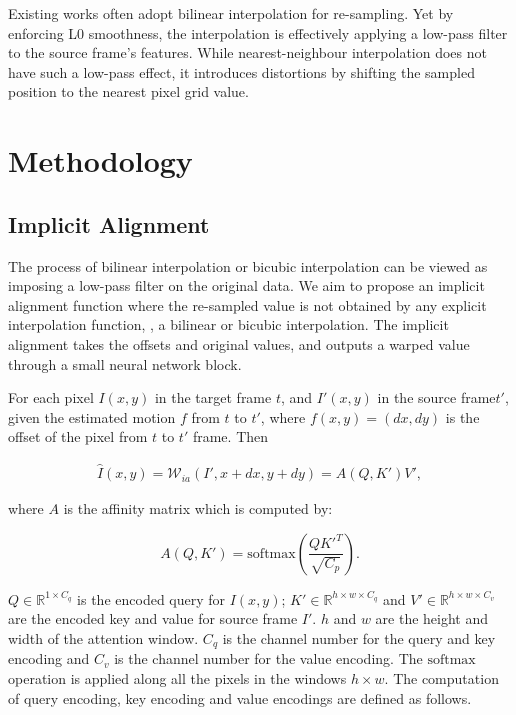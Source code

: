\documentclass[10pt,twocolumn,letterpaper]{article}
\begin{document}
Existing works often adopt bilinear interpolation for re-sampling.  Yet by enforcing L0 smoothness, the interpolation is effectively applying a low-pass filter to the source frame's features. While nearest-neighbour interpolation does not have such a low-pass effect, 
it introduces distortions by shifting the sampled position to the nearest pixel grid value.














\section{Methodology}

\subsection{Implicit Alignment}

The process of bilinear interpolation or bicubic interpolation can be viewed as imposing a low-pass filter on the original data\cite{youssef1998analysis}. We aim to propose an implicit alignment function where the re-sampled value is not obtained by 
any explicit interpolation function, \eg, a bilinear or bicubic interpolation. The implicit alignment takes the offsets and original values, and outputs a warped value through a small neural network block.

For each pixel $I(x,y)$ in the target frame $t$, and $I'(x,y)$ in the source frame$t'$, given the estimated motion $f$ from $t$ to $t'$, where $f(x,y)=(dx,dy)$ is the offset of the pixel from $t$ to $t'$ frame. Then 

\begin{multline}\label{eq:iw}
\hat{I}(x,y)=\mathcal{W}_{ia}(I',x+dx,y+dy)=A(Q, K') V',
\end{multline}

where $A$ is the affinity matrix which is computed by:

\begin{equation}
    A(Q, K')=\text{softmax}\left(\frac{QK'^T}{\sqrt{C_p}}\right).
\end{equation}

$Q \in \mathbb{R}^{1 \times C_q}$ is the encoded query for $I(x,y)$; $K' \in \mathbb{R}^{h \times w \times C_q}$ and $V' \in \mathbb{R}^{h \times w \times C_v}$ are the encoded key and value for source frame $I'$. $h$ and $w$ are the height and width of the attention window.  $C_q$ is the channel number for the query and key encoding and $C_v$ is the channel number for the value encoding. The $\text{softmax}$ operation is applied along all the pixels in the windows $h \times w$. The computation of query encoding, key encoding and value encodings are defined as follows.
\end{document}
